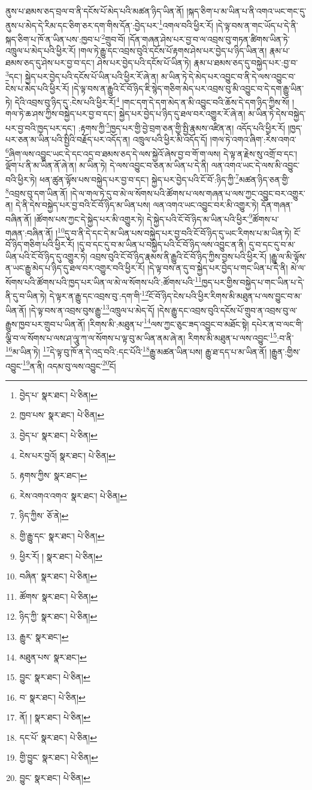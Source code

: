 ནུས་པ་ཐམས་ཅད་བྲལ་བ་ནི་དངོས་པོ་མེད་པའི་མཚན་ཉིད་ཡིན་ནོ། །སྐད་ཅིག་པ་མ་ཡིན་པ་ནི་འགའ་ཡང་གང་དུ་ནུས་པ་མེད་དེ་རིམ་དང་ཅིག་ཅར་དག་གིས་དོན་:བྱེད་པར་\footnote{བྱེད་པ་  སྣར་ཐང་།  པེ་ཅིན། }འགལ་བའི་ཕྱིར་རོ། །དེ་ལྟ་བས་ན་གང་ཡོད་པ་དེ་ནི་སྐད་ཅིག་པ་ཁོ་ན་ཡིན་པས་:ཁྱབ་པ་\footnote{ཁྱབ་པས་  སྣར་ཐང་།  པེ་ཅིན། }གྲུབ་བོ། །དོན་གཞན་ཤེས་པར་བྱ་བ་ལ་འབྲས་བུ་གཏན་ཚིགས་ཡིན་ཏེ་འཁྲུལ་པ་མེད་པའི་ཕྱིར་རོ། །གལ་ཏེ་རྒྱུ་དང་འབྲས་བུའི་དངོས་པོ་རྟགས་ཤེས་པར་བྱེད་པ་ཉིད་ཡིན་ན། རྣམ་པ་ཐམས་ཅད་དུ་ཤེས་པར་བྱ་བ་དང་། ཤེས་པར་བྱེད་པའི་དངོས་པོ་ཡིན་ཏེ། རྣམ་པ་ཐམས་ཅད་དུ་བསྐྱེད་པར་:བྱ་བ་\footnote{བྱེད་པ་  སྣར་ཐང་།  པེ་ཅིན། }དང་། སྐྱེད་པར་བྱེད་པའི་དངོས་པོ་ཡིན་པའི་ཕྱིར་རོ་ཞེ་ན། མ་ཡིན་ཏེ་དེ་མེད་པར་འབྱུང་བ་ནི་དེ་ལས་འབྱུང་བ་ངེས་པ་མེད་པའི་ཕྱིར་རོ། །དེ་ལྟ་བས་ན་རྒྱུའི་ངོ་བོ་ཉིད་ཇི་སྙེད་གཅིག་མེད་པར་འབྲས་བུ་མི་འབྱུང་བ་དེ་དག་རྒྱུ་ཡིན་ཏེ། དེའི་འབྲས་བུ་ཉིད་དུ་:ངེས་པའི་ཕྱིར་རོ།\footnote{ངེས་པར་བྱའོ།  སྣར་ཐང་།  པེ་ཅིན། } །གང་དག་དེ་དག་མེད་ན་མི་འབྱུང་བའི་ཆོས་དེ་དག་ཉིད་ཀྱིས་སོ། །གལ་ཏེ་ཆ་ཤས་ཀྱིས་བསྐྱེད་པར་བྱ་བ་དང་། སྐྱེད་པར་བྱེད་པ་ཉིད་དུ་ཐལ་བར་འགྱུར་རོ་ཞེ་ན། མ་ཡིན་ཏེ་དེས་བསྐྱེད་པར་བྱ་བའི་ཁྱད་པར་དང་། :རྟགས་ཀྱི་\footnote{རྟགས་ཀྱིས་  སྣར་ཐང་། }ཁྱད་པར་གྱི་བྱེ་བྲག་ཅན་གྱི་སྤྱི་རྣམས་འཛིན་ན། འདོད་པའི་ཕྱིར་རོ། །ཁྱད་པར་ཅན་མ་ཡིན་པའི་སྤྱིའི་བརྗོད་པར་འདོད་ན། འཁྲུལ་པའི་ཕྱིར་མི་འདོད་དོ། །གལ་ཏེ་འགའ་ཞིག་:རེས་འགའ་\footnote{རེས་འགའ་འགའ་  སྣར་ཐང་།  པེ་ཅིན། }ཞིག་ལས་འབྱུང་ཡང་དེ་དང་འདྲ་བ་ཐམས་ཅད་དེ་ལས་སྐྱེའོ་ཞེས་བྱ་བ་གོ་ག་ལས། དེ་ལྟ་ན་རྗེས་སུ་འགྲོ་བ་དང་། ལྡོག་པ་ནི་མ་ཡིན་ནོ་ཞེ་ན། མ་ཡིན་ཏེ། དེ་ལས་འབྱུང་བ་ཅན་མ་ཡིན་པ་དེ་ནི། ལན་འགའ་ཡང་དེ་ལས་མི་འབྱུང་བའི་ཕྱིར་ཏེ། ཕན་ཚུན་ལྟོས་པས་བསྐྱེད་པར་བྱ་བ་དང་། སྐྱེད་པར་བྱེད་པའི་ངོ་བོ་:ཉིད་ཀྱི་\footnote{ཉིད་ཀྱིས་  ཅོ་ནེ། }མཚན་ཉིད་ཅན་གྱི་\footnote{གྱི་རྒྱུ་དང་  སྣར་ཐང་།  པེ་ཅིན། }འབྲས་བུ་དག་ཡིན་ནོ། །དེ་ལ་གལ་ཏེ་དུ་བ་མེ་ལ་སོགས་པའི་ཚོགས་པ་ལས་གཞན་པ་ལས་ཀྱང་འབྱུང་བར་འགྱུར་ན། དེ་ནི་དེས་བསྐྱེད་པར་བྱ་བའི་ངོ་བོ་ཉིད་མ་ཡིན་པས། ལན་འགའ་ཡང་འབྱུང་བར་མི་འགྱུར་ཏེ། དོན་གཞན་བཞིན་ནོ། །ཚོགས་པས་ཀྱང་དེ་སྐྱེད་པར་མི་འགྱུར་ཏེ། དེ་སྐྱེད་པའི་ངོ་བོ་ཉིད་མ་ཡིན་པའི་ཕྱིར་\footnote{ཕྱིར་རོ། །  སྣར་ཐང་།  པེ་ཅིན། }ཚོགས་པ་གཞན་:བཞིན་ནོ། །\footnote{བཞིན་  སྣར་ཐང་།  པེ་ཅིན། }དུ་བ་ནི་དེ་དང་དེ་མ་ཡིན་པས་བསྐྱེད་པར་བྱ་བའི་ངོ་བོ་ཉིད་དུ་ཡང་རིགས་པ་མ་ཡིན་ཏེ། ངོ་བོ་ཉིད་གཅིག་པའི་ཕྱིར་རོ། །དུ་བ་དང་དུ་བ་མ་ཡིན་པ་བསྐྱེད་པའི་ངོ་བོ་ཉིད་ལས་འབྱུང་ན་ནི། དུ་བ་དང་དུ་བ་མ་ཡིན་པའི་ངོ་བོ་ཉིད་དུ་འགྱུར་ཏེ། འབྲས་བུའི་ངོ་བོ་ཉིད་རྣམས་ནི་རྒྱུའི་ངོ་བོ་ཉིད་ཀྱིས་བྱས་པའི་ཕྱིར་རོ། །རྒྱུ་ལ་མི་ལྟོས་ན་ཡང་རྒྱུ་མེད་པ་ཉིད་དུ་ཐལ་བར་འགྱུར་བའི་ཕྱིར་རོ། །དེ་ལྟ་བས་ན་དུ་བ་སྐྱེད་པར་བྱེད་པ་གང་ཡིན་པ་དེ་ནི། མེ་ལ་སོགས་པའི་ཚོགས་པའི་ཁྱད་པར་ཡིན་ལ་མེ་ལ་སོགས་པའི་:ཚོགས་པའི་\footnote{ཚོགས་  སྣར་ཐང་།  པེ་ཅིན། }ཁྱད་པར་གྱིས་བསྐྱེད་པ་གང་ཡིན་པ་དེ་ནི་དུ་བ་ཡིན་ཏེ། དེ་ལྟར་ན་རྒྱུ་དང་འབྲས་བུ་:དག་གི་\footnote{ཉིད་ཀྱི་  སྣར་ཐང་།  པེ་ཅིན། }ངོ་བོ་ཉིད་ངེས་པའི་ཕྱིར་རིགས་མི་མཐུན་པ་ལས་བྱུང་བ་མ་ཡིན་ནོ། །དེ་ལྟ་བས་ན་འབྲས་བུས་རྒྱུ་\footnote{རྒྱུར་  སྣར་ཐང་། }འཁྲུལ་པ་མེད་དོ། །དེས་རྒྱུ་དང་འབྲས་བུའི་དངོས་པོ་གྲུབ་ན་འབྲས་བུ་ལ་རྒྱུས་ཁྱབ་པར་གྲུབ་པ་ཡིན་ནོ། །རིགས་མི་:མཐུན་པ་\footnote{མཐུན་པས་  སྣར་ཐང་། }ལས་ཀྱང་ཅུང་ཟད་འབྱུང་བ་མཐོང་སྟེ། དཔེར་ན་བ་ལང་གི་ལྕི་བ་ལ་སོགས་པ་ལས་ཤ་ལཱུ་ཀ་ལ་སོགས་པ་ལྟ་བུ་མ་ཡིན་ནམ་ཞེ་ན། རིགས་མི་མཐུན་པ་ལས་འབྱུང་\footnote{བྱུང་  སྣར་ཐང་།  པེ་ཅིན། }:བ་ནི་\footnote{བ་  སྣར་ཐང་།  པེ་ཅིན། }མ་ཡིན་ཏེ། \footnote{ནོ། །   སྣར་ཐང་།  པེ་ཅིན། }དེ་ལྟ་བུ་ཁོ་ན་དེ་འདྲ་བའི་:དང་པོའི་\footnote{དང་པོ་  སྣར་ཐང་།  པེ་ཅིན། }རྒྱུ་མཚན་ཡིན་པས། རྒྱུ་ཐ་དད་པ་མ་ཡིན་ནོ། །རྒྱུན་:གྱིས་འབྱུང་\footnote{གྱི་བྱུང་  སྣར་ཐང་།  པེ་ཅིན། }ན་ནི། འདམ་བུ་ལས་འབྱུང་\footnote{བྱུང་  སྣར་ཐང་།  པེ་ཅིན། }ངོ། 